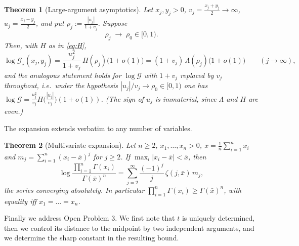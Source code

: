 \documentclass[11pt,a4paper]{amsart}
\newtheorem{theorem}{Theorem}[section]
\theoremstyle{definition}
\newcommand{\Gg}{\mathcal{G}}
\newcommand{\Gs}{\mathcal{G}_{\star}}
\begin{document}
\begin{theorem}[Large-argument asymptotics]\label{thm:asym}
Let $x_{j},y_{j}>0$, $v_{j}=\tfrac{x_j+y_j}{2}\to\infty$, $u_{j}=\tfrac{x_j-y_j}{2}$, and
put $\rho_{j}:=\frac{|u_{j}|}{1+v_{j}}$. Suppose
\[
  \rho_{j}\;\longrightarrow\;\rho_{0}\in[0,1).
\]
Then, with $H$ as in \eqref{eq:H},
\[
  \log\Gs(x_{j},y_{j})
   =\frac{u_{j}^{2}}{1+v_{j}}\,H(\rho_{j})\big(1+o(1)\big)
   =(1+v_{j})\,\Lambda(\rho_{j})\big(1+o(1)\big)
  \qquad (j\to\infty),
\]
and the analogous statement holds for $\log\Gg$ with $1+v_j$ replaced by $v_j$
throughout, i.e.\ under the hypothesis $|u_j|/v_j\to\rho_0\in[0,1)$ one has
$\log\Gg=\frac{u_j^{2}}{v_j}H\big(\frac{|u_j|}{v_j}\big)(1+o(1))$. (The sign of $u_j$ is
immaterial, since $\Lambda$ and $H$ are even.)
\end{theorem}

The expansion extends verbatim to any number of variables.

\begin{theorem}[Multivariate expansion]\label{thm:multi}
Let $n\ge2$, $x_{1},\dots,x_{n}>0$, $\bar x=\frac1n\sum_{i=1}^{n}x_{i}$ and
$m_{j}=\sum_{i=1}^{n}(x_{i}-\bar x)^{j}$ for $j\ge2$. If
$\max_{i}|x_{i}-\bar x|<\bar x$, then
\begin{equation}\label{eq:multi}
  \log\frac{\prod_{i=1}^{n}\Gamma(x_{i})}{\Gamma(\bar x)^{n}}
   =\sum_{j=2}^{\infty}\frac{(-1)^{j}}{j}\,\zeta(j,\bar x)\,m_{j},
\end{equation}
the series converging absolutely. In particular
$\prod_{i=1}^{n}\Gamma(x_{i})\ge\Gamma(\bar x)^{n}$, with equality iff $x_{1}=\dots=x_{n}$.
\end{theorem}

Finally we address Open Problem 3. We first note that $t$ is uniquely determined, then we
control its distance to the midpoint by two independent arguments, and we determine the
sharp constant in the resulting bound.
\end{document}
